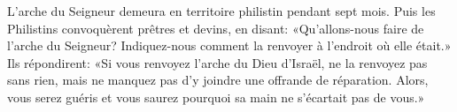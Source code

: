 L’arche du Seigneur demeura en territoire philistin pendant sept mois.
Puis les Philistins convoquèrent prêtres et devins, en disant:
	«Qu’allons-nous faire de l’arche du Seigneur?
Indiquez-nous comment la renvoyer à l’endroit où elle était.»
Ils répondirent:
	«Si vous renvoyez l’arche du Dieu d’Israël, ne la renvoyez pas sans rien,
	mais ne manquez pas d’y joindre une offrande de réparation.
Alors, vous serez guéris et vous saurez pourquoi sa main ne s’écartait pas de vous.»
